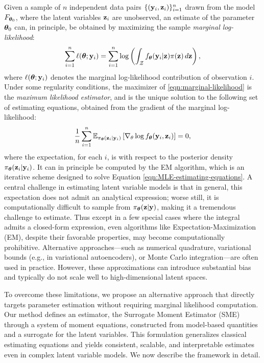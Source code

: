 \documentclass[twoside,11pt]{article}
\begin{document}
Given a sample of $n$ independent data pairs $\{({\bf y}_i, {\bf z}_i)\}_{i=1}^n$ drawn from the model $F_{{\bm{\theta}}_0}$, where the latent variables ${\bf z}_i$ are unobserved, an estimate of the parameter ${\bm{\theta}}_0$ can, in principle, be obtained by maximizing the sample \textit{marginal log-likelihood}:
\begin{equation}
\sum_{i=1}^n \ell({\bm{\theta}}; {\bf y}_i) = \sum_{i=1}^n \log\left( \int_{\mathcal Z} f_{\bm{\theta}}({\bf y}_i| {\bf z})\pi({\bf z})\,d{\bf z} \right),
\label{eqn:marginal-likelihood}
\end{equation}
where $\ell({\bm{\theta}}; {\bf y}_i)$ denotes the marginal log-likelihood contribution of observation $i$. Under some regularity conditions, the maximizer of \eqref{eqn:marginal-likelihood} is the \textit{maximum likelihood estimator}, and is the unique solution to the following set of estimating equations, obtained from the gradient of the marginal log-likelihood:
%
\begin{equation}
\frac{1}{n}\sum_{i=1}^n \mathbb{E}_{\pi_{\bm{\theta}}({\bf z}_i \mid {\bf y}_i)} \left[ \nabla_\theta \log f_{\bm{\theta}}({\bf y}_i, {\bf z}_i) \right] = 0,
\label{eqn:MLE-estimating-equations}
\end{equation}
%
where the expectation, for each $i$, is with respect to the posterior density $\pi_{\bm{\theta}}({\bf z}_i|{\bf y}_i)$. It can in principle be computed by the EM algorithm, which is an iterative scheme designed to solve Equation \eqref{eqn:MLE-estimating-equations}. A central challenge in estimating latent variable models is that in general, this expectation does not admit an analytical expression; worse still, it is computationally difficult to sample from $\pi_{\bm{\theta}}({\bf z}|{\bf y})$, making it a tremendous challenge to estimate. Thus except in a few special cases where the integral admits a closed-form expression, even algorithms like Expectation-Maximization (EM), despite their favorable properties, may become computationally prohibitive. Alternative approaches—such as numerical quadrature, variational bounds (e.g., in variational autoencoders), or Monte Carlo integration—are often used in practice. However, these approximations can introduce substantial bias and typically do not scale well to high-dimensional latent spaces.

To overcome these limitations, we propose an alternative approach that directly targets parameter estimation without requiring marginal likelihood computation. Our method defines an estimator, the Surrogate Moment Estimator (SME) through a system of moment equations, constructed from model-based quantities and a surrogate for the latent variables. This formulation generalizes classical estimating equations and yields consistent, scalable, and interpretable estimates even in complex latent variable models. We now describe the framework in detail.
\end{document}
